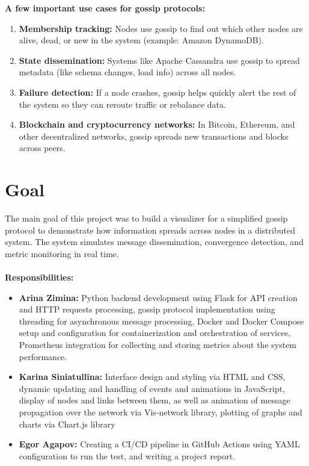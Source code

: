 \documentclass[a4paper,12pt]{article}
\begin{document}
\textbf{A few important use cases for gossip protocols:}
\begin{enumerate}
    \item \textbf{Membership tracking:} Nodes use gossip to find out which other nodes are alive, dead, or new in the system (example: Amazon DynamoDB).
    \item \textbf{State dissemination:} Systems like Apache Cassandra use gossip to spread metadata (like schema changes, load info) across all nodes.
    \item \textbf{Failure detection:} If a node crashes, gossip helps quickly alert the rest of the system so they can reroute traffic or rebalance data.
    \item \textbf{Blockchain and cryptocurrency networks:} In Bitcoin, Ethereum, and other decentralized networks, gossip spreads new transactions and blocks across peers.
\end{enumerate}

\section{Goal}

The main goal of this project was to build a visualizer for a simplified gossip protocol to demonstrate how information spreads across nodes in a distributed system. The system simulates message dissemination, convergence detection, and metric monitoring in real time.\\\\
\textbf{Responsibilities:}
\begin{itemize}
    \item \textbf{Arina Zimina:} Python backend development using Flask for API creation and HTTP requests processing, gossip protocol implementation using threading for asynchronous message processing, Docker and Docker Compose setup and configuration for containerization and orchestration of services, Prometheus integration for collecting and storing metrics about the system performance.
    \item \textbf{Karina Siniatullina:} Interface design and styling via HTML and CSS, dynamic updating and handling of events and animations in JavaScript, display of nodes and links between them, as well as animation of message propagation over the network via Vis-network library, plotting of graphs and charts via Chart.js library
    \item \textbf{Egor Agapov:} Creating a CI/CD pipeline in GitHub Actions using YAML configuration to run the test, and writing a project report.
\end{itemize}
\end{document}
